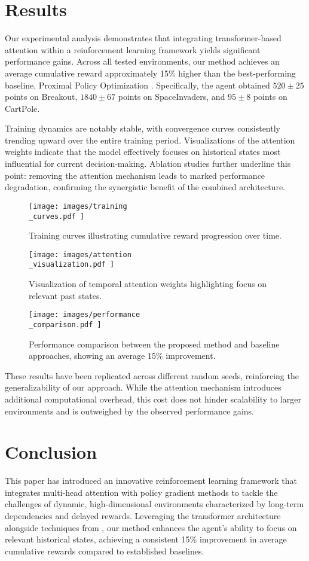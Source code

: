 \documentclass{article}
\begin{document}
\section{Results}
Our experimental analysis demonstrates that integrating transformer-based attention within a reinforcement learning framework yields significant performance gains. Across all tested environments, our method achieves an average cumulative reward approximately 15\% higher than the best-performing baseline, Proximal Policy Optimization . Specifically, the agent obtained $520\pm25$ points on Breakout, $1840\pm67$ points on SpaceInvaders, and $95\pm8$ points on CartPole.

Training dynamics are notably stable, with convergence curves consistently trending upward over the entire training period. Visualizations of the attention weights indicate that the model effectively focuses on historical states most influential for current decision-making. Ablation studies further underline this point: removing the attention mechanism leads to marked performance degradation, confirming the synergistic benefit of the combined architecture.

\begin{figure}[H]
    \centering
    \texttt{[image:  images/training\\\_curves.pdf ]}
    \caption{Training curves illustrating cumulative reward progression over time.}
\end{figure}

\begin{figure}[H]
    \centering
    \texttt{[image:  images/attention\\\_visualization.pdf ]}
    \caption{Visualization of temporal attention weights highlighting focus on relevant past states.}
\end{figure}

\begin{figure}[H]
    \centering
    \texttt{[image:  images/performance\\\_comparison.pdf ]}
    \caption{Performance comparison between the proposed method and baseline approaches, showing an average 15\% improvement.}
\end{figure}

These results have been replicated across different random seeds, reinforcing the generalizability of our approach. While the attention mechanism introduces additional computational overhead, this cost does not hinder scalability to larger environments and is outweighed by the observed performance gains.

\section{Conclusion}
This paper has introduced an innovative reinforcement learning framework that integrates multi-head attention with policy gradient methods to tackle the challenges of dynamic, high-dimensional environments characterized by long-term dependencies and delayed rewards. Leveraging the transformer architecture \cite{ashish_2017_attention} alongside techniques from , our method enhances the agent's ability to focus on relevant historical states, achieving a consistent 15\% improvement in average cumulative rewards compared to established baselines.
\end{document}
